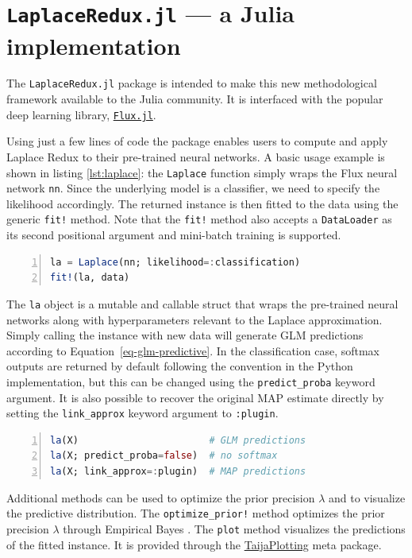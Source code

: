 \documentclass{juliacon}
\begin{document}
\section{\texorpdfstring{\texttt{LaplaceRedux.jl} --- a Julia
implementation}{LaplaceRedux.jl --- a Julia implementation}}\label{laplaceredux.jl-a-julia-implementation}

The \texttt{LaplaceRedux.jl} package is intended to make this new
methodological framework available to the Julia community. It is
interfaced with the popular deep learning library,
\href{https://fluxml.ai/}{\texttt{Flux.jl}}.

Using just a few lines of code the package enables users to compute and
apply Laplace Redux to their pre-trained neural networks. A basic usage
example is shown in listing \ref{lst:laplace}: the \texttt{Laplace}
function simply wraps the Flux neural network \texttt{nn}. Since the
underlying model is a classifier, we need to specify the likelihood
accordingly. The returned instance is then fitted to the data using the
generic \texttt{fit!} method. Note that the \texttt{fit!} method also
accepts a \texttt{DataLoader} as its second positional argument and
mini-batch training is supported.

\begin{lstlisting}[language=Julia, escapechar=@, numbers=left, label={lst:laplace}, caption={}]
la = Laplace(nn; likelihood=:classification)
fit!(la, data)
\end{lstlisting}

The \texttt{la} object is a mutable and callable struct that wraps the
pre-trained neural networks along with hyperparameters relevant to the
Laplace approximation. Simply calling the instance with new data will
generate GLM predictions according to Equation~\ref{eq-glm-predictive}.
In the classification case, softmax outputs are returned by default
following the convention in the Python implementation, but this can be
changed using the \texttt{predict\_proba} keyword argument. It is also
possible to recover the original MAP estimate directly by setting the
\texttt{link\_approx} keyword argument to \texttt{:plugin}.

\begin{lstlisting}[language=Julia, escapechar=@, numbers=left, label={lst:laplace}, caption={}]
la(X)                       # GLM predictions
la(X; predict_proba=false)  # no softmax
la(X; link_approx=:plugin)  # MAP predictions
\end{lstlisting}

Additional methods can be used to optimize the prior precision
\(\lambda\) and to visualize the predictive distribution. The
\texttt{optimize\_prior!} method optimizes the prior precision
\(\lambda\) through Empirical Bayes \cite{daxberger2021laplace}. The
\texttt{plot} method visualizes the predictions of the fitted instance.
It is provided through the
\href{https://github.com/JuliaTrustworthyAI/TaijaPlotting.jl}{TaijaPlotting}
meta package.
\end{document}

